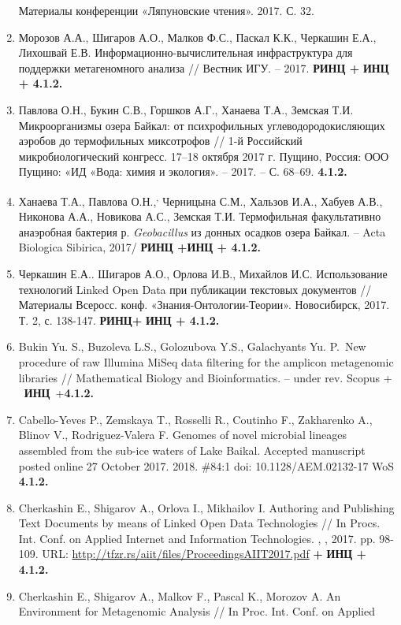 \documentclass[a4paper,12pt,openany,final]{extreport}
\begin{document}
\begin{enumerate}
  Материалы конференции «Ляпуновские чтения». 2017. С. 32.
\item
  Морозов А.А., Шигаров А.О., Малков Ф.С., Паскал К.К., Черкашин Е.А.,
  Лихошвай Е.В. Информационно-вычислительная инфраструктура для
  поддержки метагеномного анализа // Вестник ИГУ. -- 2017. \textbf{РИНЦ
  +} \textbf{ИНЦ + 4.1.2.}
\item
  Павлова О.Н., Букин С.В., Горшков А.Г., Ханаева Т.А., Земская Т.И.
  Микроорганизмы озера Байкал: от психрофильных углеводородокисляющих
  аэробов до термофильных миксотрофов // 1-й Российский
  микробиологический конгресс. 17--18 октября 2017 г. Пущино, Россия:
  ООО Пущино: «ИД «Вода: химия и экология». -- 2017. -- С. 68--69.
  \textbf{4.1.2.}
\item
  Ханаева Т.А., Павлова О.Н.,\textsuperscript{,} Черницына С.М., Хальзов
  И.А., Хабуев А.В., Никонова А.А., Новикова А.С., Земская Т.И.
  Термофильная факультативно анаэробная бактерия р. \emph{Geobacillus}
  из донных осадков озера Байкал. -- Acta Biologica Sibirica, 2017/
  \textbf{РИНЦ +ИНЦ + 4.1.2.} ~
\item
  Черкашин Е.А.. Шигаров А.О., Орлова И.В., Михайлов И.С. Использование
  технологий Linked Open Data при публикации текстовых документов //
  Материалы Всеросс. конф. «Знания-Онтологии-Теории». Новосибирск, 2017.
  Т. 2, с. 138-147. \textbf{РИНЦ+} \textbf{ИНЦ + 4.1.2.}
\item
  Bukin Yu. S., Buzoleva L.S., Golozubova Y.S., Galachyants Yu. P.~New
  procedure of raw Illumina MiSeq data filtering for the amplicon
  metagenomic libraries // Mathematical Biology and Bioinformatics. --
  under rev. Scopus + ~\textbf{ИНЦ}~+\textbf{4.1.2.}
\item
  Cabello-Yeves P., Zemskaya T., Rosselli R., Coutinho F., Zakharenko
  A., Blinov V., Rodriguez-Valera F. Genomes of novel microbial lineages
  assembled from the sub-ice waters of Lake Baikal. Accepted manuscript
  posted online 27 October 2017. 2018. \#84:1 doi: 10.1128/AEM.02132-17
  WoS \textbf{4.1.2.}
\item
  Cherkashin E., Shigarov A., Orlova I., Mikhailov I. Authoring and
  Publishing Text Documents by means of Linked Open Data Technologies //
  In Procs. Int. Conf. on Applied Internet and Information Technologies.
  , , 2017. pp. 98-109. URL:
  \url{http://tfzr.rs/aiit/files/ProceedingsAIIT2017.pdf} \textbf{+}
  \textbf{ИНЦ + 4.1.2.}
\item
  Cherkashin E., Shigarov A., Malkov F., Pascal K., Morozov A. An
  Environment for Metagenomic Analysis // In Proc. Int. Conf. on Applied

\end{enumerate}
\end{document}
